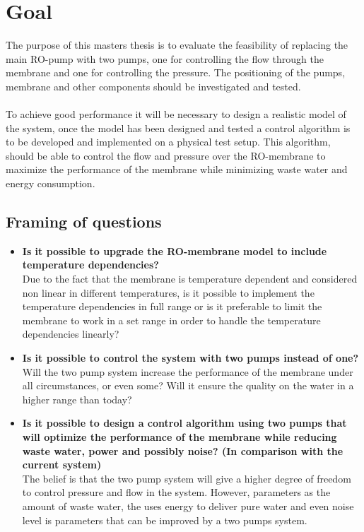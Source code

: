 \section{Goal}
The purpose of this masters thesis is to evaluate the feasibility of replacing the main RO-pump with two pumps, one for controlling the flow through the membrane and one for controlling the pressure. The positioning of the pumps, membrane and other components should be investigated and tested. \\
\\
To achieve good performance it will be necessary to design a realistic model of the system, once the model has been designed and tested a control algorithm is to be developed and implemented on a physical test setup. This algorithm, should be able to control the flow and pressure over the RO-membrane to maximize the performance of the membrane while minimizing waste water and energy consumption. \\


\subsection{Framing of questions}
\label{framing}
\begin{itemize}
\renewcommand\labelitemi{-}
   \item \textbf{Is it possible to upgrade the RO-membrane model to include temperature dependencies?}\\ Due to the fact that the membrane is temperature dependent and considered non linear in different temperatures, is it possible to implement the temperature dependencies in full range or is it preferable to limit the membrane to work in a set range in order to handle the temperature dependencies linearly?
   \item \textbf{Is it possible to control the system with two pumps instead of one?}\\ Will the two pump system increase the performance of the membrane under all circumstances, or even some? Will it ensure the quality on the water in a higher range than today?   
   \item \textbf{Is it possible to design a control algorithm using two pumps that will optimize the performance of the membrane while reducing waste water, power and possibly noise? (In comparison with the current system)}\\ The belief is that the two pump system will give a higher degree of freedom to control pressure and flow in the system. However, parameters as the amount of waste water, the uses energy to deliver pure water and even noise level is parameters that can be improved by a two pumps system.  
\end{itemize}


